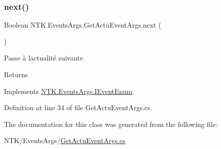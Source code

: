 \subsubsection{\texorpdfstring{next()}{next()}}
{\footnotesize\ttfamily Boolean N\+T\+K.\+Events\+Args.\+Get\+Actu\+Event\+Args.\+next (\begin{DoxyParamCaption}{ }\end{DoxyParamCaption})}



Passe à l\textquotesingle{}actualité suivante 

\begin{DoxyReturn}{Returns}

\end{DoxyReturn}


Implements \mbox{\hyperlink{interface_n_t_k_1_1_events_args_1_1_i_event_enum_a2b8c40d6d7e9899659aa5a469da93586}{N\+T\+K.\+Events\+Args.\+I\+Event\+Enum}}.



Definition at line 34 of file Get\+Actu\+Event\+Args.\+cs.



The documentation for this class was generated from the following file\+:\begin{DoxyCompactItemize}
\item 
N\+T\+K/\+Events\+Args/\mbox{\hyperlink{_get_actu_event_args_8cs}{Get\+Actu\+Event\+Args.\+cs}}\end{DoxyCompactItemize}
